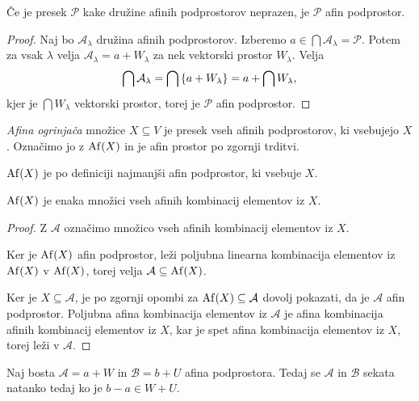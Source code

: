 \begin{trditev}
    Če je presek $\mathcal{P}$ kake družine afinih podprostorov neprazen, je $\mathcal{P}$ afin podprostor.
\end{trditev}

\begin{proof}
    Naj bo $\mathcal{A}_{\lambda}$ družina afinih podprostorov. Izberemo $a \in \bigcap \mathcal{A}_{\lambda} = \mathcal{P}$. Potem za vsak $\lambda$ velja $\mathcal{A}_{\lambda} = a + W_{\lambda}$ za nek vektorski prostor $W_{\lambda}$. Velja
    \[
    \bigcap \mathcal{A}_{\lambda} = \bigcap \left\{a + W_{\lambda}\right\} = a + \bigcap W_{\lambda},
    \]
    kjer je $\bigcap W_{\lambda}$ vektorski prostor, torej je $\mathcal{P}$ afin podprostor.
\end{proof}

\begin{definicija}
    \emph{Afina ogrinjača} množice $X \subseteq V$ je presek vseh afinih podprostorov, ki vsebujejo $X$. Označimo jo z $\operatorname{Af} (X)$ in je afin prostor po zgornji trditvi.
\end{definicija}

\begin{opomba}
    $\operatorname{Af} (X)$ je po definiciji najmanjši afin podprostor, ki vsebuje $X$.
\end{opomba}

\begin{trditev}
    $\operatorname{Af} (X)$ je enaka množici vseh afinih kombinacij elementov iz $X$.
\end{trditev}

\begin{proof}
    Z $\mathcal{A}$ označimo množico vseh afinih kombinacij elementov iz $X$.

    Ker je $\operatorname{Af} (X)$ afin podprostor, leži poljubna linearna kombinacija elementov iz $\operatorname{Af} (X)$ v $\operatorname{Af} (X)$, torej velja $\mathcal{A} \subseteq \operatorname{Af} (X)$.

    Ker je $X \subseteq \mathcal{A}$, je po zgornji opombi za $\operatorname{Af} (X) \subseteq \mathcal{A}$ dovolj pokazati, da je $\mathcal{A}$ afin podprostor. Poljubna afina kombinacija elementov iz $\mathcal{A}$ je afina kombinacija afinih kombinacij elementov iz $X$,
    kar je spet afina kombinacija elementov iz $X$, torej leži v $\mathcal{A}$.
\end{proof}

\begin{lema}
    Naj bosta $\mathcal{A} = a + W$ in $\mathcal{B} = b + U$ afina podprostora. Tedaj se $\mathcal{A}$ in $\mathcal{B}$ sekata natanko tedaj ko je $b - a \in W + U$.
\end{lema}

